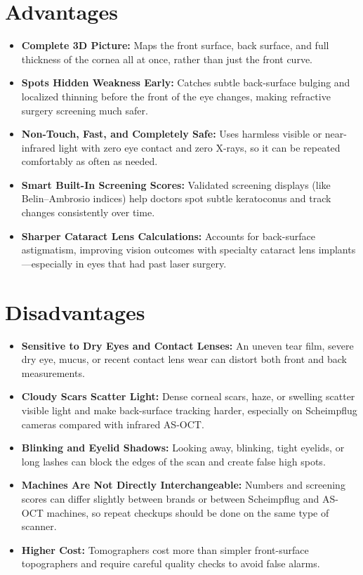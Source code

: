 \section{Advantages}
\begin{itemize}
    \item \textbf{Complete 3D Picture:} Maps the front surface, back surface, and full thickness of the cornea all at once, rather than just the front curve.
    \item \textbf{Spots Hidden Weakness Early:} Catches subtle back-surface bulging and localized thinning before the front of the eye changes, making refractive surgery screening much safer.
    \item \textbf{Non-Touch, Fast, and Completely Safe:} Uses harmless visible or near-infrared light with zero eye contact and zero X-rays, so it can be repeated comfortably as often as needed.
    \item \textbf{Smart Built-In Screening Scores:} Validated screening displays (like Belin--Ambrosio indices) help doctors spot subtle keratoconus and track changes consistently over time.
    \item \textbf{Sharper Cataract Lens Calculations:} Accounts for back-surface astigmatism, improving vision outcomes with specialty cataract lens implants---especially in eyes that had past laser surgery.
\end{itemize}

\section{Disadvantages}
\begin{itemize}
    \item \textbf{Sensitive to Dry Eyes and Contact Lenses:} An uneven tear film, severe dry eye, mucus, or recent contact lens wear can distort both front and back measurements.
    \item \textbf{Cloudy Scars Scatter Light:} Dense corneal scars, haze, or swelling scatter visible light and make back-surface tracking harder, especially on Scheimpflug cameras compared with infrared AS-OCT.
    \item \textbf{Blinking and Eyelid Shadows:} Looking away, blinking, tight eyelids, or long lashes can block the edges of the scan and create false high spots.
    \item \textbf{Machines Are Not Directly Interchangeable:} Numbers and screening scores can differ slightly between brands or between Scheimpflug and AS-OCT machines, so repeat checkups should be done on the same type of scanner.
    \item \textbf{Higher Cost:} Tomographers cost more than simpler front-surface topographers and require careful quality checks to avoid false alarms.
\end{itemize}

